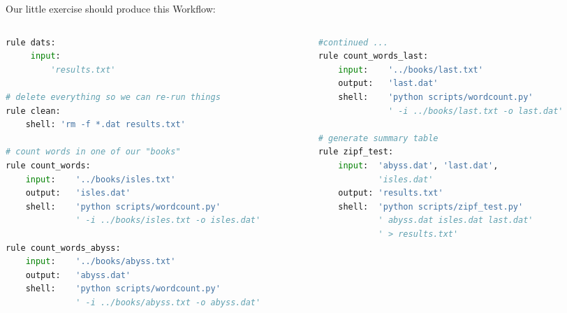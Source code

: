 \begin{frame}[fragile]
Our little exercise should produce this Workflow:
  \begin{columns}
    \begin{column}{0.5\textwidth}
      \begin{lstlisting}[language=Python,style=Python, basicstyle=\tiny]
rule dats:
     input:
         'results.txt'

# delete everything so we can re-run things
rule clean:
    shell: 'rm -f *.dat results.txt'

# count words in one of our "books"
rule count_words:
    input:    '../books/isles.txt'
    output:   'isles.dat'
    shell:    'python scripts/wordcount.py'
              ' -i ../books/isles.txt -o isles.dat'

rule count_words_abyss:
    input:    '../books/abyss.txt'
    output:   'abyss.dat'
    shell:    'python scripts/wordcount.py' 
              ' -i ../books/abyss.txt -o abyss.dat'
      \end{lstlisting}
    \end{column}
    \begin{column}{0.5\textwidth}
      \begin{lstlisting}[language=Python,style=Python, basicstyle=\tiny]
#continued ...
rule count_words_last:
    input:    '../books/last.txt'
    output:   'last.dat'
    shell:    'python scripts/wordcount.py'
              ' -i ../books/last.txt -o last.dat'
              
# generate summary table
rule zipf_test:
    input:  'abyss.dat', 'last.dat', 
            'isles.dat'
    output: 'results.txt'
    shell:  'python scripts/zipf_test.py' 
            ' abyss.dat isles.dat last.dat'
            ' > results.txt'
      \end{lstlisting}
    \end{column}
  \end{columns}
\end{frame}


  

